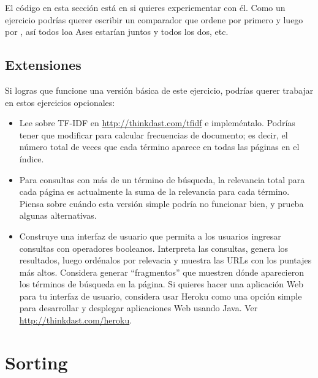 \documentclass[12pt]{book}
\theoremstyle{exercise}
\begin{document}

El código en esta sección está en  si quieres experiementar
con él. Como un ejercicio podrías querer escribir un comparador que ordene
por  primero y luego por , así todos loa Ases
estarían juntos y todos los dos, etc.


\section{Extensiones}
\label{extensions}


Si logras que funcione una versión básica de este ejercicio, podrías querer
trabajar en estos ejercicios opcionales:

\begin{itemize}

\item Lee sobre TF-IDF en \url{http://thinkdast.com/tfidf} e
  impleméntalo. Podrías tener que modificar  para
  calcular frecuencias de documento; es decir, el número total de veces
  que cada término aparece en todas las páginas en el índice.

\item Para consultas con más de un término de búsqueda, la relevancia total para
  cada página es actualmente la suma de la relevancia para cada término. Piensa
  sobre cuándo esta versión simple podría no funcionar bien, y prueba algunas
  alternativas.

\item Construye una interfaz de usuario que permita a los usuarios ingresar
  consultas con operadores booleanos. Interpreta las consultas, genera los
  resultados, luego ordénalos por relevacia y muestra las URLs con los puntajes
  más altos. Considera generar ``fragmentos'' que muestren dónde aparecieron los
  términos de búsqueda en la página. Si quieres hacer una aplicación Web para
  tu interfaz de usuario, considera usar Heroku como una opción simple para
  desarrollar y desplegar aplicaciones Web usando Java.  Ver
  \url{http://thinkdast.com/heroku}.

\end{itemize}



\chapter{Sorting}
\end{document}
